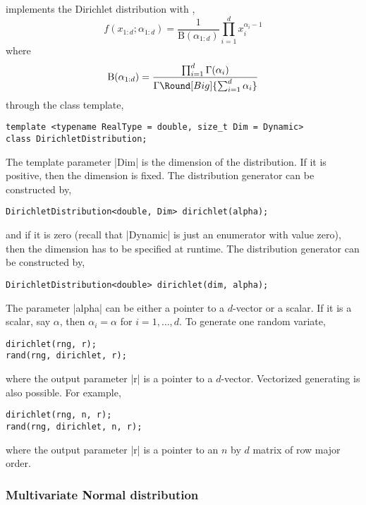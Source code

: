 \mckl implements the Dirichlet distribution with \pdf,
\begin{equation*}
  f(x_{1:d};\alpha_{1:d}) = \frac{1}{\mathrm{B}(\alpha_{1:d})}
  \prod_{i=1}^d x_i^{\alpha_i - 1}
\end{equation*}
where
\begin{equation*}
  \mathrm{B}(\alpha_{1:d}) =
  \frac{\prod_{i=1}^d\Gamma(\alpha_i)}
  {\Gamma\Round[Big]{\sum_{i=1}^d\alpha_i}}
\end{equation*}
through the class template,
\begin{Verbatim}
template <typename RealType = double, size_t Dim = Dynamic>
class DirichletDistribution;
\end{Verbatim}
The template parameter |Dim| is the dimension of the distribution. If it is
positive, then the dimension is fixed. The distribution generator can be
constructed by,
\begin{Verbatim}
DirichletDistribution<double, Dim> dirichlet(alpha);
\end{Verbatim}
and if it is zero (recall that |Dynamic| is just an enumerator with value
zero), then the dimension has to be specified at runtime. The distribution
generator can be constructed by,
\begin{Verbatim}
DirichletDistribution<double> dirichlet(dim, alpha);
\end{Verbatim}
The parameter |alpha| can be either a pointer to a $d$-vector or a scalar. If
it is a scalar, say $\alpha$, then $\alpha_i = \alpha$ for $i = 1,\dots,d$. To
generate one random variate,
\begin{Verbatim}
dirichlet(rng, r);
rand(rng, dirichlet, r);
\end{Verbatim}
where the output parameter |r| is a pointer to a $d$-vector. Vectorized
generating is also possible. For example,
\begin{Verbatim}
dirichlet(rng, n, r);
rand(rng, dirichlet, n, r);
\end{Verbatim}
where the output parameter |r| is a pointer to an $n$ by $d$ matrix of row
major order.

\subsubsection{Multivariate Normal distribution}

